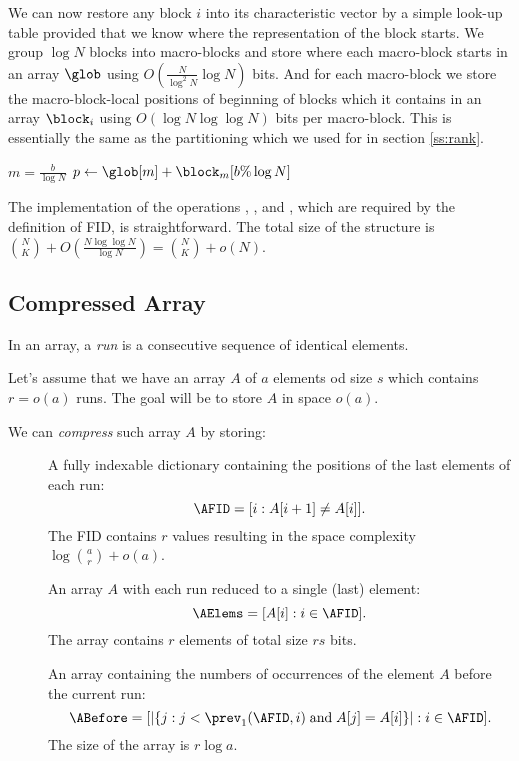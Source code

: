 We can now restore any block $i$ into its characteristic vector by a simple look-up table provided that we know where the representation of the block starts.
We group $\log N$ blocks into macro-blocks and store where each macro-block starts in an array $\glob$ using $O\left(\frac{N}{\log^2 N} \log N\right)$ bits.
And for each macro-block we store the macro-block-local positions of beginning of blocks which it contains in an array $\block_i$ using $O(\log N \log \log N)$ bits per macro-block.
This is essentially the same as the partitioning which we used for \rank{} in section \ref{ss:rank}.

\begin{algorithm}
\begin{algorithmic}
 
	\State $m = \frac{b}{\log N}$
	\State $p \gets \glob[m] + \block_m[b \% \log N]$
	\State {}
\EndFunction
\end{algorithmic}
\end{algorithm}

The implementation of the operations \rank{}, \select{}, and \inspect{}, which are required by the definition of FID, is straightforward.
The total size of the structure is ${N \choose K} + O\left(\frac{N \log \log N}{\log N}\right) = {N \choose K} + o(N)$.

\subsection{Compressed Array}\label{s:compressed-array}

In an array, a \emph{run} is a consecutive sequence of identical elements.

Let's assume that we have an array $A$ of $a$ elements od size $s$ which contains $r = o(a)$ runs.
The goal will be to store $A$ in space $o(a)$.

We can \emph{compress} such array $A$ by storing:
\begin{description}
	\item[\AFID]
	A fully indexable dictionary containing the positions of the last elements of each run:
	$$ \AFID = [i : A[i + 1] \ne A[i]]. $$
	The FID contains $r$ values resulting in the space complexity $\log {a \choose r} + o(a)$.

	\item[\AElems]
	An array $A$ with each run reduced to a single (last) element:
	$$ \AElems = [A[i] : i \in \AFID]. $$
	The array contains $r$ elements of total size $rs$ bits.
	
	\item[\ABefore]
	An array containing the numbers of occurrences of the element $A$ before the current run:
	$$ \ABefore = [|\{ j : j < \prev_1(\AFID, i) \booland A[j] = A[i] \}| : i \in \AFID ]. $$
	The size of the array is $r \log a$.
\end{description}

